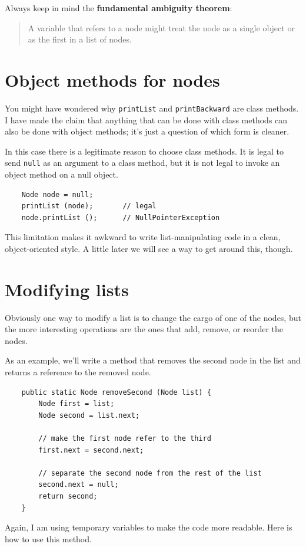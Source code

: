 \documentclass[12pt]{book}
\theoremstyle{exercise}
\begin{document}
Always keep in mind the {\bf fundamental ambiguity theorem}:

\begin{quote}
A variable that refers to a node
might treat the node as a single object or as the first
in a list of nodes.
\end{quote}


\section{Object methods for nodes}

You might have wondered why {\tt printList} and {\tt printBackward}
are class methods.  I have made the claim that anything that can
be done with class methods can also be done with object methods;
it's just a question of which form is cleaner.

In this case there is a legitimate reason to choose
class methods.  It is legal to send {\tt null}
as an argument to a class method, but it is not legal to invoke
an object method on a null object.

\begin{verbatim}
	Node node = null;
	printList (node);       // legal
	node.printList ();      // NullPointerException
\end{verbatim}
%
This limitation makes it awkward to write list-manipulating
code in a clean, object-oriented style.  A little later we
will see a way to get around this, though.


\section{Modifying lists}

Obviously one way to modify a list is to change the cargo of
one of the nodes, but the more interesting operations are the
ones that add, remove, or reorder the nodes.

As an example, we'll write a method that removes the second
node in the list and returns a reference to the removed node.

\begin{verbatim}
    public static Node removeSecond (Node list) {
        Node first = list;
        Node second = list.next;

        // make the first node refer to the third
        first.next = second.next;

        // separate the second node from the rest of the list
        second.next = null;
        return second;
    }
\end{verbatim}
%
Again, I am using temporary variables to make the code more
readable.  Here is how to use this method.
\end{document}
